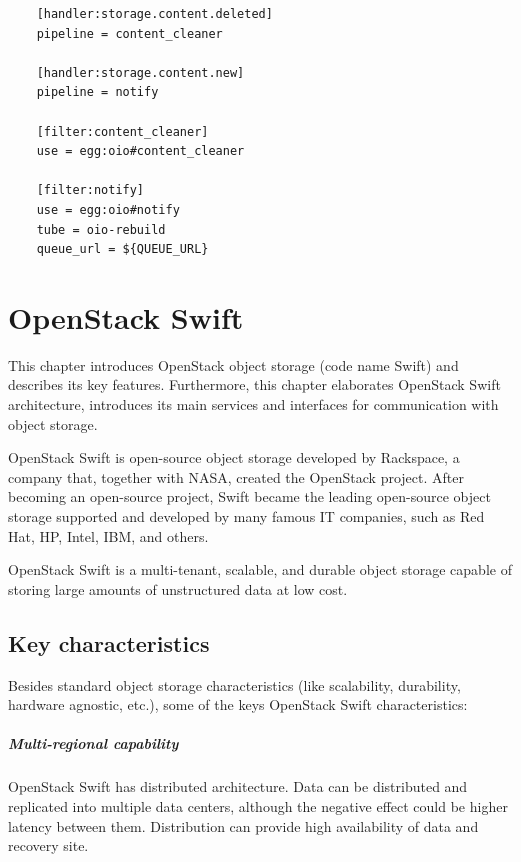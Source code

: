     \lstset{
        caption=Example of event-agent handler configuration,
        label=lst:event-agent-handlers
    }
    \begin{minipage}{\linewidth}
    \begin{lstlisting}
    [handler:storage.content.deleted]
    pipeline = content_cleaner

    [handler:storage.content.new]
    pipeline = notify

    [filter:content_cleaner]
    use = egg:oio#content_cleaner

    [filter:notify]
    use = egg:oio#notify
    tube = oio-rebuild
    queue_url = ${QUEUE_URL}
    \end{lstlisting}
    \end{minipage}

\chapter{OpenStack Swift}\label{chap:swift}
    This chapter introduces OpenStack object storage (code name Swift) and describes its key features. Furthermore, this chapter elaborates OpenStack Swift architecture, introduces its main services and interfaces for communication with object storage.

    OpenStack Swift is open-source object storage developed by Rackspace, a company that, together with NASA, created the OpenStack project. After becoming an open-source project, Swift became the leading open-source object storage supported and developed by many famous IT companies, such as Red Hat, HP, Intel, IBM, and others.

    OpenStack Swift is a multi-tenant, scalable, and durable object storage capable of storing large amounts of unstructured data at low cost\cite{swiftOpenStackSwift}.

    \section{Key characteristics}
    Besides standard object storage characteristics (like scalability, durability, hardware agnostic, etc.), some of the keys OpenStack Swift characteristics:

    \paragraph{Multi-regional capability}
    OpenStack Swift has distributed architecture. Data can be distributed and replicated into multiple data centers, although the negative effect could be higher latency between them. Distribution can provide high availability of data and recovery site\cite{swiftOpenStackSwift}.

